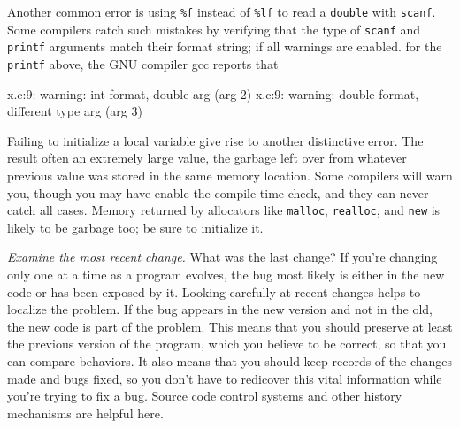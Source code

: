 Another common error is using \verb'%f' instead of \verb'%lf' to read a
\verb'double' with \verb'scanf'. Some compilers catch such mistakes by
verifying that the type of \verb'scanf' and \verb'printf' arguments match
their format string; if all warnings are enabled. for the \verb'printf'
above, the GNU compiler gcc reports that 
\begin{wellcode}
    x.c:9: warning: int format, double arg (arg 2)
    x.c:9: warning: double format, different type arg (arg 3)
\end{wellcode}

Failing to initialize a local variable give rise to another distinctive
error. The result often an extremely large value, the garbage left over
from whatever previous value was stored in the same memory location. Some
compilers will warn you, though you may have enable the compile-time check,
and they can never catch all cases. Memory returned by allocators like
\verb'malloc', \verb'realloc', and \verb'new' is likely to be garbage too;
be sure to initialize it.

\emph{Examine the most recent change.} What was the last change? If you're
changing only one at a time as a program evolves, the bug most likely is
either in the new code or has been exposed by it. Looking carefully at
recent changes helps to localize the problem. If the bug appears in the new
version and not in the old, the new code is part of the problem. This means
that you should preserve at least the previous version of the program,
which you believe to be correct, so that you can compare behaviors. It also
means that you should keep records of the changes made and bugs fixed, so
you don't have to redicover this vital information while you're trying to
fix a bug. Source code control systems and other history mechanisms are
helpful here.

